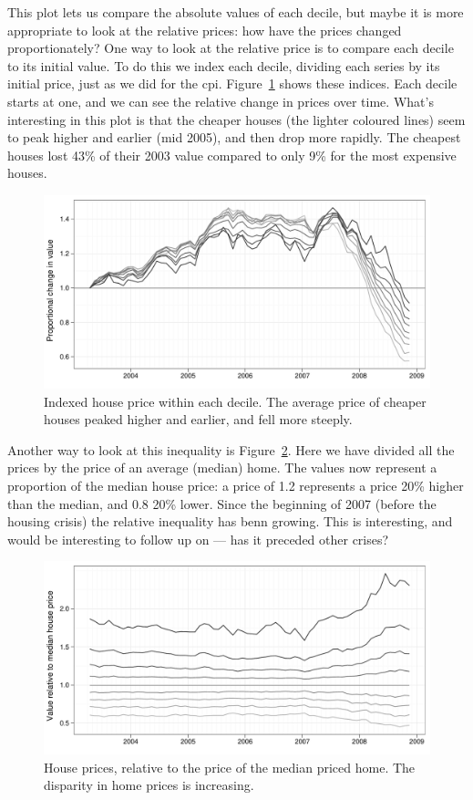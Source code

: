 \documentclass[oneside]{article}
\begin{document}
This plot lets us compare the absolute values of each decile, but maybe it is more appropriate to look at the relative prices: how have the prices changed proportionately?  One way to look at the relative price is to compare each decile to its initial value.  To do this we index each decile, dividing each series by its initial price, just as we did for the {\sc cpi}. Figure~\ref{fig:decile-ind} shows these indices.  Each decile starts at one, and we can see the relative change in prices over time.  What's interesting in this plot is that the cheaper houses (the lighter coloured lines) seem to peak higher and earlier (mid 2005), and then drop more rapidly.  The cheapest houses lost 43\% of their 2003 value compared to only 9\% for the most expensive houses.

\begin{figure}[htbp]
  \centering
  \includegraphics[width=0.75\linewidth]{decile-ind}
  \caption{Indexed house price within each decile.  The average price of cheaper houses peaked higher and earlier, and fell more steeply.}
  \label{fig:decile-ind}
\end{figure}

Another way to look at this inequality is Figure~\ref{fig:decile-rel}.  Here we have divided all the prices by the price of an average (median) home.  The values now represent a proportion of the median house price: a price of 1.2 represents a price 20\% higher than the median, and 0.8 20\% lower. Since the beginning of 2007 (before the housing crisis) the relative inequality has benn growing.  This is interesting, and would be interesting to follow up on --- has it preceded other crises?

\begin{figure}[htbp]
  \centering
  \includegraphics[width=0.75\linewidth]{decile-rel}
  \caption{House prices, relative to the price of the median priced home.  The disparity in home prices is increasing.}
  \label{fig:decile-rel}
\end{figure}
\end{document}
